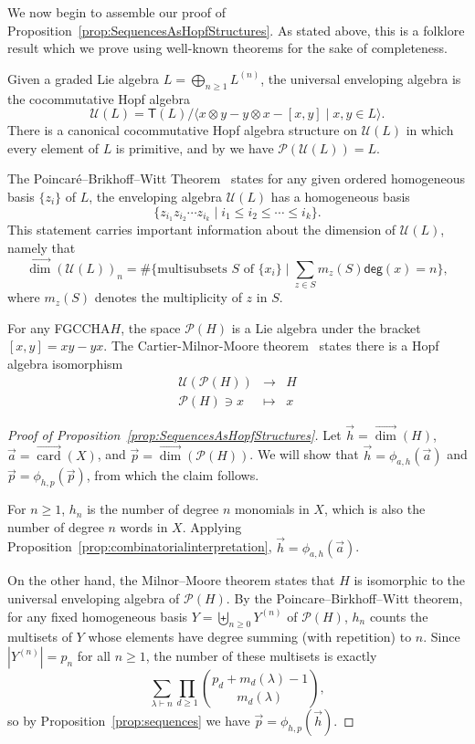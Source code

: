 \documentclass[11pt]{amsart}
\theoremstyle{definition}
\numberwithin{equation}{section}
\newcommand{\FGCCHA}{\textsf{FGCCHA}\xspace}
\newcommand{\vecdim}{\overrightarrow{\dim}}
\newcommand{\veccard}{\overrightarrow{\operatorname{card}}}
\begin{document}
We now begin to assemble our proof of Proposition~\ref{prop:SequencesAsHopfStructures}.  
As stated above, this is a folklore result which we prove using well-known theorems for the sake of completeness.  

Given a graded Lie algebra $L = \bigoplus_{n \ge 1} L^{(n)}$, the universal enveloping algebra is the cocommutative Hopf algebra
\[
\mathcal{U}(L) = \mathsf{T}(L) \big/ \big\langle x\otimes y - y \otimes x - [x, y] \;|\; \text{$x, y \in L$} \big\rangle.
\]
There is a canonical cocommutative Hopf algebra structure on $\mathcal{U}(L)$ in which every element of $L$ is primitive, and by \cite[Theorem 1.4]{Reutenauer-FreeLieAlgebras} we have $\mathcal{P}(\mathcal{U}(L))=L$.  

The Poincar\'{e}--Brikhoff--Witt Theorem~\cite[??]{Reutenauer-FreeLieAlgebras} states for any given ordered homogeneous basis $\{z_i\}$ of $L$, the enveloping algebra $\mathcal{U}(L)$ has a homogeneous basis 
\[
\{ z_{i_1}z_{i_2}\cdots z_{i_k} \;|\; i_1 \leq i_2 \leq \cdots \leq i_k\}.
\]
This statement carries important information about the dimension of $\mathcal{U}(L)$, namely that 
\[
\vecdim(\mathcal{U}(L))_{n}= \#\{\text{multisubsets $S$ of $\{x_{i}\}$} \;|\; \sum_{z \in S} m_{z}(S) \mathsf{deg}(x) = n\},
\]
where $m_{z}(S)$ denotes the multiplicity of $z$ in $S$.

For any \FGCCHA $H$, the space $\mathcal{P}(H)$ is a Lie algebra under the bracket $[x, y] = xy - yx$.  
The Cartier-Milnor-Moore theorem~\cite[see Theorem 5.18]{MM65} states there is a Hopf algebra isomorphism 
\[
\begin{array}{rcl}
\mathcal{U}(\mathcal{P}(H)) &\to& H \\
\mathcal{P}(H) \ni x & \mapsto&  x
\end{array}
\]

\begin{proof}[Proof of Proposition~\ref{prop:SequencesAsHopfStructures}]
Let $\vec{h} = \vecdim(H)$, $\vec{a} = \veccard(X)$, and $\vec{p} = \vecdim(\mathcal{P}(H))$.  We will show that $\vec{h} = \phi_{a, h}(\vec{a})$ and $\vec{p} = \phi_{h, p}(\vec{p})$, from which the claim follows.  

For $n \ge 1$, $h_{n}$ is the number of degree $n$ monomials in $X$, which is also the number of degree $n$ words in $X$.  
Applying Proposition~\ref{prop:combinatorialinterpretation}, $\vec{h} = \phi_{a, h}(\vec{a})$.

On the other hand, the Milnor--Moore theorem states that $H$ is
isomorphic to the universal enveloping algebra of $\mathcal{P}(H)$.
By the Poincare--Birkhoff--Witt theorem, for any fixed homogeneous basis
$Y = \biguplus_{n \ge 0} Y^{(n)}$ of $\mathcal{P}(H)$, $h_{n}$ counts
the multisets of $Y$ whose elements have degree summing (with repetition)
to $n$.  Since $|Y^{(n)}| = p_{n}$ for all $n \ge 1$, the number of these
multisets is exactly
\[
\sum_{\lambda \vdash n} \prod_{d \geq 1} \binom{p_d + m_d(\lambda) -1}{m_d(\lambda)},
\]
so by Proposition~\ref{prop:sequences} we have $\vec{p} = \phi_{h, p}(\vec{h})$.
\end{proof}
\end{document}

